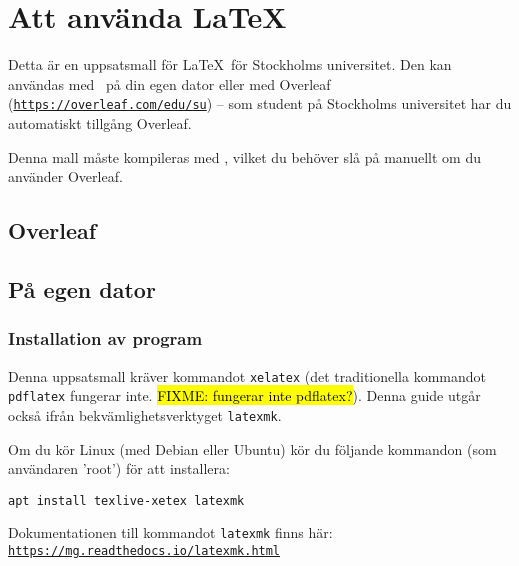 
\section{Att använda \LaTeX}
\label{latex}

Detta är en uppsatsmall för \LaTeX\ för Stockholms universitet. Den kan
användas med \XeLaTeX\ på din egen dator eller med Overleaf
(\texttt{\href{https://overleaf.com/edu/su}{https://\linebreak[0]{}overleaf\linebreak[0]{}.com/\linebreak[0]{}edu/\linebreak[0]{}su}})
-- som student på Stockholms universitet har du automatiskt tillgång Overleaf.

Denna mall måste kompileras med \XeLaTeX, vilket du behöver slå på manuellt om
du använder Overleaf.

\subsection{Overleaf}


\subsection{På egen dator}

\subsubsection{Installation av program}

Denna uppsatsmall kräver kommandot \texttt{xelatex} (det traditionella
kommandot \texttt{pdflatex} fungerar inte. \hl{FIXME: fungerar inte
pdflatex?}). Denna guide utgår också ifrån bekvämlighetsverktyget
\texttt{latexmk}.

\noindent Om du kör Linux (med Debian eller Ubuntu) kör du följande kommandon
(som användaren 'root') för att installera:

\begin{verbatim}
apt install texlive-xetex latexmk
\end{verbatim}

\noindent Dokumentationen till kommandot \texttt{latexmk} finns här:
\texttt{\href{https://mg.readthedocs.io/latexmk.html}{https://\linebreak[0]{}mg\linebreak[0]{}.readthedocs\linebreak[0]{}.io/\linebreak[0]{}latexmk\linebreak[0]{}.html}}


